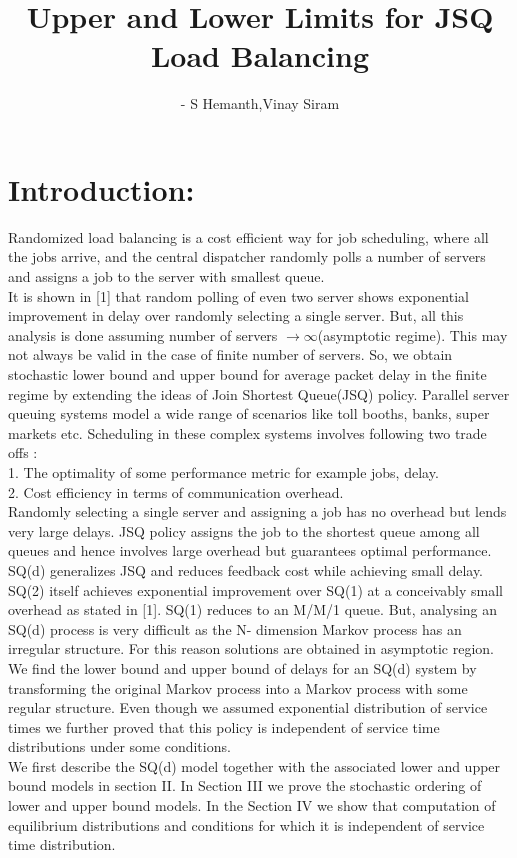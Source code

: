 \documentclass[a4paper,english,12pt]{article}
\title{Upper and Lower Limits for JSQ Load Balancing}
\author{- S Hemanth,Vinay Siram}
\begin{document}
				
\maketitle

\section{Introduction:}
Randomized load balancing is a cost efficient way for job scheduling, where all the jobs arrive, and the central dispatcher randomly polls a number of servers and assigns a job to the server with smallest queue.\\
It is shown in [1] that random polling of even two server shows exponential improvement in delay over randomly selecting a single server. But, all this analysis is done assuming number of servers $\rightarrow \infty$(asymptotic regime). This may not always be valid in the case of finite number of servers. So, we obtain stochastic lower bound and upper bound for average packet delay in the finite regime by extending the ideas of Join Shortest Queue(JSQ) policy.
Parallel server queuing systems model a wide range of scenarios like toll booths, banks, super markets etc. Scheduling in these complex systems involves following two trade offs :\\
1. The optimality of some performance metric for example jobs, delay.\\
 2. Cost efficiency in terms of communication overhead.\\
Randomly selecting a single server and assigning a job has no overhead but lends very large delays. JSQ policy assigns the job to the shortest queue among all queues and hence involves large overhead but guarantees optimal performance.\\
SQ(d) generalizes JSQ and reduces feedback cost while achieving small delay. SQ(2) itself achieves exponential improvement over SQ(1) at a conceivably small overhead as stated in [1].
SQ(1) reduces to an M/M/1 queue. But, analysing an SQ(d) process is very difficult as the N- dimension Markov process has an irregular structure. For this reason solutions are obtained in asymptotic region.\\
We find the lower bound and upper bound of delays for an SQ(d) system by transforming the original Markov process into a Markov process with some regular structure. Even though we assumed exponential distribution of service times we further proved that this policy is independent of service time distributions under some conditions.\\
We first describe the SQ(d) model together with the associated lower and upper bound models in section II. In Section III we prove the stochastic ordering of lower and upper bound models. In the Section IV we show that computation of equilibrium distributions and conditions for which it is independent of service time distribution.
\end{document}
